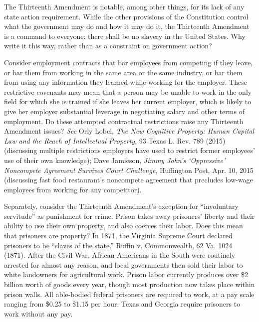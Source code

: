 The Thirteenth Amendment is notable, among other things, for its lack of any
state action requirement.  While the other provisions of the Constitution
control what the government may do and how it may do it, the Thirteenth
Amendment is a command to everyone: there shall be no slavery in the United
States.  Why write it this way, rather than as a constraint on government
action?  

Consider employment contracts that bar employees from competing if they leave,
or bar them from working in the same area or the same industry, or bar them
from using any information they learned while working for the employer.  These
restrictive covenants may mean that a person may be unable to work in the only
field for which she is trained if she leaves her current employer, which is
likely to give her employer substantial leverage in negotiating salary and
other terms of employment.  Do these attempted contractual restrictions raise
any Thirteenth Amendment issues?  \textit{See }Orly Lobel, \textit{The New
Cognitive Property: Human Capital Law and the Reach of Intellectual Property},
93 Texas L. Rev. 789 (2015) (discussing multiple restrictions employers have
used to restrict former employees' use of their own knowledge); Dave Jamieson,
\emph{Jimmy
John's `Oppressive' Noncompete Agreement Survives Court Challenge}, Huffington
Post, Apr. 10, 2015 (discussing fast food restaurant's noncompete agreement
that precludes low-wage employees from working for any competitor).

Separately, consider the Thirteenth Amendment's exception for ``involuntary
servitude'' as punishment for crime.  Prison takes away prisoners' liberty and
their ability to use their own property, and also coerces their labor.  Does
this mean that prisoners are property?  In 1871, the Virginia Supreme Court
declared prisoners to be ``slaves of the state.'' Ruffin v. Commonwealth, 62
Va. 1024 (1871).  After the Civil War, African-Americans in the South were
routinely arrested for almost any reason, and local governments then sold their
labor to white landowners for agricultural work.  Prison labor currently
produces over \$2 billion worth of goods every year, though most production now
takes place within prison walls.  All able-bodied federal prisoners are
required to work, at a pay scale ranging from \$0.25 to \$1.15 per hour.  Texas
and Georgia require prisoners to work without any pay.

